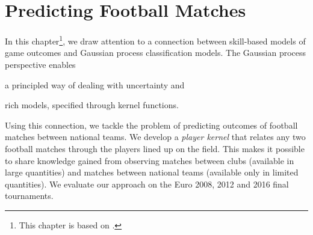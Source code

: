 \chapter{Predicting Football Matches}
\label{ch:playerkern}

In this chapter\footnote{%
This chapter is based on \citet*{maystre2016player}.},
we draw attention to a connection between skill-based models of game outcomes and Gaussian process classification models.
The Gaussian process perspective enables
\begin{enuminline}
\item a principled way of dealing with uncertainty and
\item rich models, specified through kernel functions.
\end{enuminline}
Using this connection, we tackle the problem of predicting outcomes of football matches between national teams.
We develop a \emph{player kernel} that relates any two football matches through the players lined up on the field.
This makes it possible to share knowledge gained from observing matches between clubs (available in large quantities) and matches between national teams (available only in limited quantities).
We evaluate our approach on the Euro 2008, 2012 and 2016 final tournaments.







